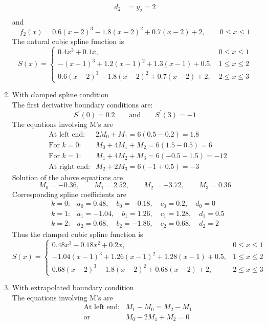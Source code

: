 \documentclass[12pt,class=book,crop=false]{standalone}
\begin{document}
\begin{soln}
\begin{enumerate}[label=(\alph*)]
\begin{align*}
			d_2&=y_2=2\\
		\end{align*}
		and
		\[
			f_2 (x)=0.6(x-2)^3-1.8(x-2)^2+0.7(x-2)+2,\qquad 0 \leq x \leq 1
		\]
		The natural cubic spline function is
		\[
			S(x)=\begin{cases}
				0.4x^3+0.1x, &0 \leq x \leq 1\\
				-(x-1)^3+1.2(x-1)^2+1.3(x-1)+0.5, &1 \leq x \leq 2\\
				0.6(x-2)^3-1.8(x-2)^2+0.7(x-2)+2, &2 \leq x \leq 3	
			\end{cases}
		\]
		\item With clamped spline condition\\
		The first derivative boundary conditions are:
		\[
			S^{'} (0)=0.2 \qquad \text{and} \qquad S^{'} (3)=-1
		\]
		The equations involving M's are
		\begin{align*}
			&\text{At left end:}		&2M_0+M_1=6(0.5-0.2)=1.8\\
			&\text{For } k = 0: &M_0+4M_1+M_2=6(1.5-0.5)=6\\
			&\text{For } k = 1:		&M_1+4M_2+M_3=6(-0.5-1.5)=-12\\
			&\text{At right end:}		&M_2+2M_3=6(-1+0.5)=-3
		\end{align*}
		Solution of the above equations are
		\[
			M_0=-0.36,\qquad M_1=2.52,\qquad M_2=-3.72,\qquad M_3=0.36
		\]
		Corresponding spline coefficients are
		\begin{align*}
			&k=0:		&a_0=0.48,\quad b_0=-0.18,\quad  c_0=0.2,\quad  d_0=0\\
			&k=1:		&a_1=-1.04,\quad  b_1=1.26,\quad  c_1=1.28,\quad  d_1=0.5\\
			&k=2:		&a_2=0.68,\quad  b_2=-1.86,\quad  c_2=0.68,\quad  d_2=2
		\end{align*}
		Thus the clamped cubic spline function is
		\[
			S(x)=\begin{cases}
				0.48x^3-0.18x^2+0.2x, &0 \leq x \leq 1\\
				-1.04(x-1)^3+1.26(x-1)^2+1.28(x-1)+0.5, &1 \leq x \leq 2\\
				0.68(x-2)^3-1.8(x-2)^2+0.68(x-2)+2, &2 \leq x \leq 3
			\end{cases}
		\]
		\item With extrapolated boundary condition\\
		The equations involving M's are
		\begin{align*}
			&\text{At left end:} &M_1-M_0=M_2-M_1\\
			&\text{or}			&M_0-2M_1+M_2=0\\

\end{align*}
\end{enumerate}
\end{soln}
\end{document}
